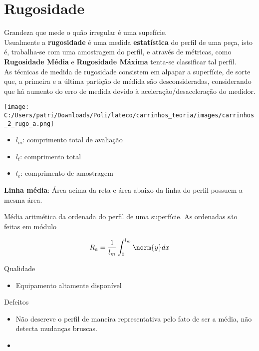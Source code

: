 \section{Rugosidade}

Grandeza que mede o quão irregular é uma supefície.\\
Usualmente a \textbf{rugosidade} é uma medida \textbf{estatística} do perfil de uma peça, isto é, trabalha-se com uma amostragem do perfil, e através de métricas, como \textbf{Rugosidade Média} e \textbf{Rugosidade Máxima} tenta-se classificar tal perfil.\\ As técnicas de medida de rugosidade consistem em alpapar a superfície, de sorte que, a primeira e a última partição de médida são desconsideradas, considerando que há aumento do erro de medida devido à aceleração/desaceleração do medidor.
\begin{center}
\texttt{[image: C:/Users/patri/Downloads/Poli/lateco/carrinhos\_teoria/images/carrinhos\_2\_rugo\_a.png]}
\end{center}

\begin{itemize}
	\item $l_m$: comprimento total de avaliação
	\item $l_t$: comprimento total
	\item $l_e$: comprimento de amostragem
\end{itemize}

\textbf{Linha média}: Área acima da reta e área abaixo da linha do perfil possuem a mesma área.

\begin{namedtheorem}
  Média aritmética da ordenada do perfil de uma superfície. As ordenadas são feitas em módulo
\end{namedtheorem}

$$ R_a = \frac{1}{l_m} \int_{0}^{l_m} \norm{y} dx$$

Qualidade
\begin{itemize}
	\item Equipamento altamente disponível
\end{itemize}

Defeitos
\begin{itemize}
	\item Não descreve o perfil de maneira representativa pelo fato de ser a média, não detecta mudanças bruscas.
	\item
\end{itemize}

